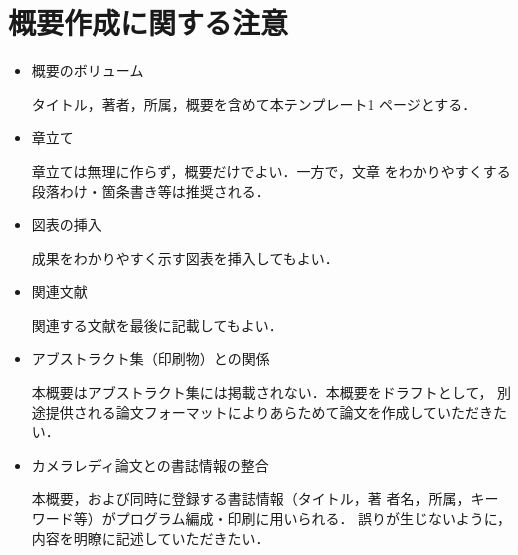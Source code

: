 \documentclass[Japanese]{dicomopapers}
\begin{document}
\section{概要作成に関する注意}
\begin{itemize}
\item 概要のボリューム

タイトル，著者，所属，概要を含めて本テンプレート1
ページとする．

\item 章立て

章立ては無理に作らず，概要だけでよい．一方で，文章
をわかりやすくする段落わけ・箇条書き等は推奨される．

\item 図表の挿入

成果をわかりやすく示す図表を挿入してもよい．

\item 関連文献

関連する文献を最後に記載してもよい．

\item アブストラクト集（印刷物）との関係

本概要はアブストラクト集には掲載されない．本概要をドラフトとして，
別途提供される論文フォーマットによりあらためて論文を作成していただきたい．

\item カメラレディ論文との書誌情報の整合

本概要，および同時に登録する書誌情報（タイトル，著
者名，所属，キーワード等）がプログラム編成・印刷に用いられる．
誤りが生じないように，内容を明瞭に記述していただきたい．

\end{itemize}
\end{document}
